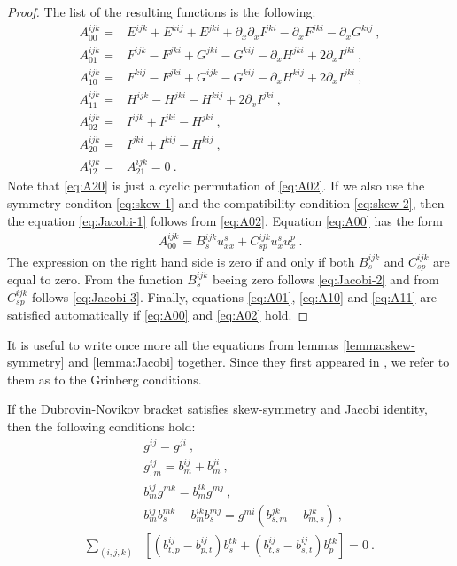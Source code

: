 \begin{proof}
    The list of the resulting functions is the following:
    \begin{align}
        A_{00}^{ijk} =& E^{ijk} + E^{kij} + E^{jki} + \partial_x \partial_x I^{jki} - \partial_x F^{jki} - \partial_x G^{kij} \:, \label{eq:A00}\\
        A_{01}^{ijk} =& F^{ijk} - F^{jki} + G^{jki} - G^{kij} - \partial_x H^{jki} + 2 \partial_x I^{jki} \:, \label{eq:A01}\\
        A_{10}^{ijk} =& F^{kij} - F^{jki} + G^{ijk} - G^{kij} - \partial_x H^{kij} + 2 \partial_x I^{jki} \:, \label{eq:A10}\\
        A_{11}^{ijk} =& H^{ijk} - H^{jki} - H^{kij} + 2 \partial_x I^{jki} \:, \label{eq:A11} \\
        A_{02}^{ijk} =& I^{ijk} + I^{jki} - H^{jki}\:, \label{eq:A02}\\
        A_{20}^{ijk} =& I^{jki} + I^{kij} - H^{kij}\:, \label{eq:A20} \\
        A^{ijk}_{12} =& A^{ijk}_{21} = 0 \:.
    \end{align}
    Note that \eqref{eq:A20} is just a cyclic permutation of \eqref{eq:A02}. If we also use the symmetry conditon \eqref{eq:skew-1} and the compatibility condition \eqref{eq:skew-2}, then the equation \eqref{eq:Jacobi-1} follows from \eqref{eq:A02}. Equation \eqref{eq:A00} has the form
    \begin{align}
        A_{00}^{ijk} = B^{ijk}_s u^s_{xx} + C^{ijk}_{sp} u^s_x u^p_x \:.
    \end{align}
    The expression on the right hand side is zero if and only if both $B^{ijk}_s$ and $C^{ijk}_{sp}$ are equal to zero. From the function $B^{ijk}_s$ beeing zero follows \eqref{eq:Jacobi-2} and from $C^{ijk}_{sp}$ follows \eqref{eq:Jacobi-3}. Finally, equations \eqref{eq:A01}, \eqref{eq:A10} and \eqref{eq:A11} are satisfied automatically if \eqref{eq:A00} and \eqref{eq:A02} hold.
\end{proof}

It is useful to write once more all the equations from lemmas \vref{lemma:skew-symmetry} and \vref{lemma:Jacobi} together. Since they first appeared in \cite{Grinberg}, we refer to them as to the Grinberg conditions.
\begin{lemma} \label{Grinberg conditions}
    If the Dubrovin-Novikov bracket satisfies skew-symmetry and Jacobi identity, then the following conditions hold:
    \begin{align}
        &g^{ij} = g^{ji} \:, \label{eq:Grinberg-1}\\
        &g^{ij}_{,m} = b^{ij}_m + b^{ji}_m \:, \label{eq:Grinberg-2}\\
        &b^{ij}_m g^{mk} = b^{ik}_m g^{mj} \:, \label{eq:Grinberg-3}\\
        &b^{ij}_{m} b^{mk}_s - b^{ik}_m b^{mj}_s = g^{mi} \left( b^{jk}_{s,m} - b^{jk}_{m,s} \right) \:, \label{eq:Grinberg-4}\\
        \sum_{(i,j,k)}& \left[ (b^{ij}_{t,p} - b^{ij}_{p,t}) b^{tk}_s + (b^{ij}_{t,s} - b^{ij}_{s,t}) b^{tk}_p \right] = 0 \:. \label{eq:Grinberg-5}
    \end{align}
\end{lemma}

